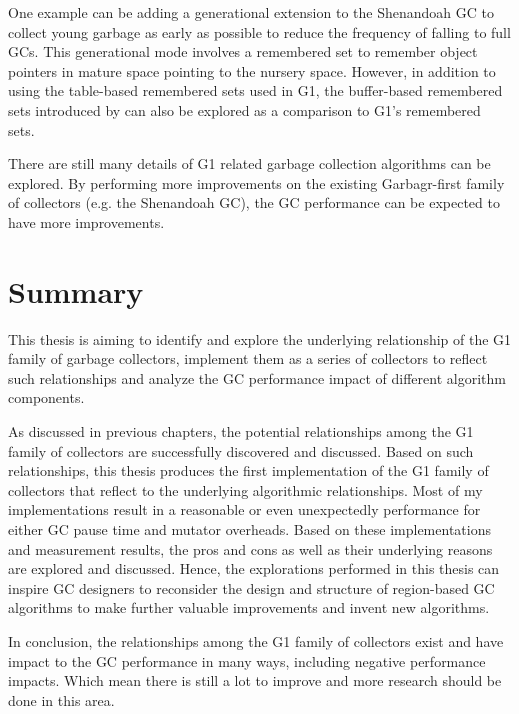 One example can be adding a generational extension to the Shenandoah GC to collect
young garbage as early as possible to reduce the frequency of falling to full GCs.
This generational mode involves a remembered set to remember object pointers in mature
space pointing to the nursery space. However, in addition to using the table-based remembered
sets used in G1, the buffer-based remembered sets introduced by \cite{blackburn2008immix} can
also be explored as a comparison to G1's remembered sets.

There are still many details of G1 related garbage collection algorithms can be
explored. By performing more improvements on the existing Garbagr-first family of collectors
(e.g. the Shenandoah GC), the GC performance can be expected to have more improvements.

\section{Summary}

This thesis is aiming to identify and explore the underlying relationship of the
G1 family of garbage collectors, implement them as a series of collectors to
reflect such relationships and analyze the GC performance impact of different algorithm components.

As discussed in previous chapters, the potential relationships among the G1 family of collectors
are successfully discovered and discussed.
Based on such relationships, this thesis produces the first implementation of the
G1 family of collectors that reflect to the underlying algorithmic relationships.
Most of my implementations result in a reasonable
or even unexpectedly performance for either GC pause time and mutator overheads.
Based on these implementations and measurement results, the pros and cons as well
as their underlying reasons are explored and discussed.
Hence, the explorations performed in this thesis can inspire GC designers to
reconsider the design and structure of region-based GC algorithms to make
further valuable improvements and invent new algorithms.

In conclusion, the relationships among the G1 family of collectors exist and have
impact to the GC performance in many ways, including negative performance impacts.
Which mean there is still a lot to improve and more research should be done in this area.





